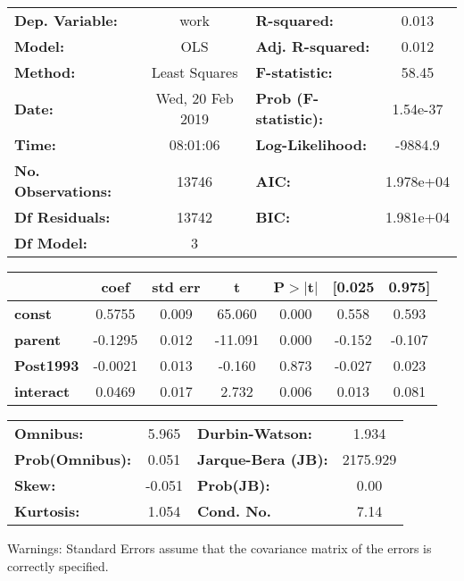 \begin{center}
\begin{tabular}{lclc}
\toprule
\textbf{Dep. Variable:}    &       work       & \textbf{  R-squared:         } &     0.013   \\
\textbf{Model:}            &       OLS        & \textbf{  Adj. R-squared:    } &     0.012   \\
\textbf{Method:}           &  Least Squares   & \textbf{  F-statistic:       } &     58.45   \\
\textbf{Date:}             & Wed, 20 Feb 2019 & \textbf{  Prob (F-statistic):} &  1.54e-37   \\
\textbf{Time:}             &     08:01:06     & \textbf{  Log-Likelihood:    } &   -9884.9   \\
\textbf{No. Observations:} &       13746      & \textbf{  AIC:               } & 1.978e+04   \\
\textbf{Df Residuals:}     &       13742      & \textbf{  BIC:               } & 1.981e+04   \\
\textbf{Df Model:}         &           3      & \textbf{                     } &             \\
\bottomrule
\end{tabular}
\begin{tabular}{lcccccc}
                  & \textbf{coef} & \textbf{std err} & \textbf{t} & \textbf{P$>$$|$t$|$} & \textbf{[0.025} & \textbf{0.975]}  \\
\midrule
\textbf{const}    &       0.5755  &        0.009     &    65.060  &         0.000        &        0.558    &        0.593     \\
\textbf{parent}   &      -0.1295  &        0.012     &   -11.091  &         0.000        &       -0.152    &       -0.107     \\
\textbf{Post1993} &      -0.0021  &        0.013     &    -0.160  &         0.873        &       -0.027    &        0.023     \\
\textbf{interact} &       0.0469  &        0.017     &     2.732  &         0.006        &        0.013    &        0.081     \\
\bottomrule
\end{tabular}
\begin{tabular}{lclc}
\textbf{Omnibus:}       &  5.965 & \textbf{  Durbin-Watson:     } &    1.934  \\
\textbf{Prob(Omnibus):} &  0.051 & \textbf{  Jarque-Bera (JB):  } & 2175.929  \\
\textbf{Skew:}          & -0.051 & \textbf{  Prob(JB):          } &     0.00  \\
\textbf{Kurtosis:}      &  1.054 & \textbf{  Cond. No.          } &     7.14  \\
\bottomrule
\end{tabular}
\end{center}

Warnings: \newline
 [1] Standard Errors assume that the covariance matrix of the errors is correctly specified.